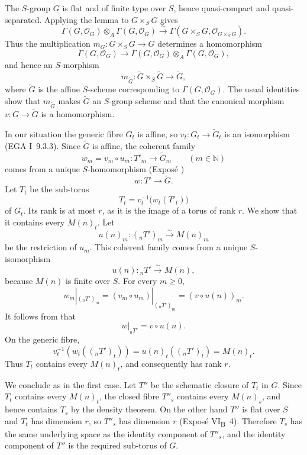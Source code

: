 The \(S\)-group \(G\) is flat and of finite type over \(S\), hence
quasi-compact and quasi-separated. Applying the lemma to
\(G\times_SG\) gives
\[
 \Gamma(G,\mathcal O_G)\otimes_A\Gamma(G,\mathcal O_G)
 \xrightarrow{\sim}
 \Gamma(G\times_SG,\mathcal O_{G\times_SG}).
\]
Thus the multiplication \(m_G:G\times_SG\to G\) determines a
homomorphism
\[
 \Gamma(G,\mathcal O_G)\longrightarrow
 \Gamma(G,\mathcal O_G)\otimes_A\Gamma(G,\mathcal O_G),
\]
and hence an \(S\)-morphism
\[
  m_{\widetilde G}:\widetilde G\times_S\widetilde G
  \longrightarrow\widetilde G,
\]
where \(\widetilde G\) is the affine \(S\)-scheme corresponding to
\(\Gamma(G,\mathcal O_G)\). The usual identities show that
\(m_{\widetilde G}\) makes \(\widetilde G\) an \(S\)-group scheme and
that the canonical morphism \(v:G\to\widetilde G\) is a homomorphism.


In our situation the generic fibre \(G_t\) is affine, so
\(v_t:G_t\to\widetilde G_t\) is an isomorphism (EGA I~9.3.3). Since
\(\widetilde G\) is affine, the coherent family
\[
  w_m=v_m\circ u_m:T'_m\longrightarrow\widetilde G_m
  \qquad(m\in\mathbb N)
\]
comes from a unique \(S\)-homomorphism (Exposé )
\[
  w:T'\longrightarrow\widetilde G.
\]
Let \(T_t\) be the sub-torus
\[
  T_t=v_t^{-1}\bigl(w_t(T'_t)\bigr)
\]
of \(G_t\). Its rank is at most \(r\), as it is the image of a torus of rank \(r\). We show that it contains every
\(M(n)_t\). Let
\[
 u(n)_m:({}_nT')_m\xrightarrow{\sim}M(n)_m
\]
be the restriction of \(u_m\). This coherent family comes from a
unique \(S\)-isomorphism
\[
  u(n):{}_nT'\xrightarrow{\sim}M(n),
\]
because \(M(n)\) is finite over \(S\). For every \(m\geq0\),
\[
 w_m|_{({}_nT')_m}
  =(v_m\circ u_m)|_{({}_nT')_m}
  =(v\circ u(n))_m.
\]
It follows from  that
\[
  w|_{{}_nT'}=v\circ u(n).
\]
On the generic fibre,
\[
 v_t^{-1}\!\left(w_t(({}_nT')_t)\right)
 =u(n)_t(({}_nT')_t)=M(n)_t.
\]
Thus \(T_t\) contains every \(M(n)_t\), and consequently has rank
\(r\).

We conclude as in the first case. Let \(T''\) be the schematic closure
of \(T_t\) in \(G\). Since \(T_t\) contains every \(M(n)_t\), the
closed fibre \(T''_s\) contains every \(M(n)_s\), and hence contains
\(T_s\) by the density theorem. On the other hand \(T''\) is flat
over \(S\) and \(T_t\) has dimension \(r\), so \(T''_s\) has
dimension \(r\) (Exposé VI\textsubscript{B}~4). Therefore \(T_s\)
has the same underlying space as the identity component of \(T''_s\),
and the identity component of \(T''\) is the required sub-torus of
\(G\).


